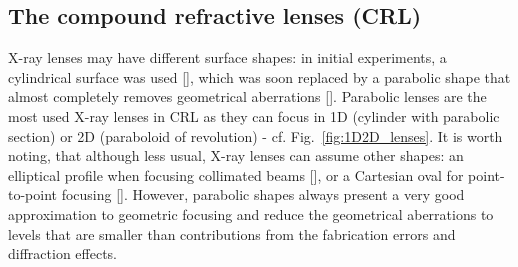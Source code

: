 \begin{refsection}
\section{The compound refractive lenses (CRL)}\label{sec:CRL}

X-ray lenses may have different surface shapes: in initial experiments, a cylindrical surface was used [\cite{Snigirev1996, Protopopov1998}], which was soon replaced by a parabolic shape that almost completely removes geometrical aberrations [\cite{Elleaume1998, Lengeler1999}]. Parabolic lenses are the most used X-ray lenses in CRL as they can focus in 1D (cylinder with parabolic section) or 2D (paraboloid of revolution) - cf. Fig.~\ref{fig:1D2D_lenses}. It is worth noting, that although less usual, X-ray lenses can assume other shapes: an elliptical profile when focusing collimated beams [\cite{Evans-Lutterodt2003}], or a Cartesian oval for point-to-point focusing [\cite{SanchezdelRio2012}]. However, parabolic shapes always present a very good approximation to geometric focusing and reduce the geometrical aberrations to levels that are smaller than contributions from the fabrication errors and diffraction effects.
\clearpage

\end{refsection}
